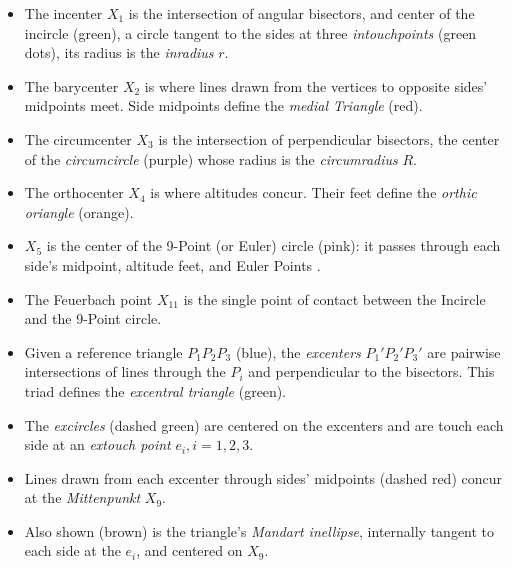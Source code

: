 \begin{itemize}
    \item The incenter $X_1$ is the intersection of angular bisectors, and center of the incircle (green), a circle tangent to the sides at three {\em intouchpoints} (green dots), its radius is the {\em inradius} $r$.
    \item The barycenter $X_2$ is where lines drawn from the vertices to opposite sides' midpoints meet. Side midpoints define the {\em medial Triangle} (red).
    \item The circumcenter $X_3$ is the intersection of perpendicular bisectors, the center of the {\em circumcircle} (purple) whose radius is the {\em circumradius} $R$.
    \item The orthocenter $X_4$ is where altitudes concur. Their feet define the {\em orthic oriangle} (orange).
    \item $X_5$ is the center of the 9-Point (or Euler) circle (pink): it passes through each side's midpoint, altitude feet, and Euler Points \cite{mw}.
    \item The Feuerbach point $X_{11}$ is the single point of contact between the Incircle and the 9-Point circle.
    \item Given a reference triangle $P_1P_2P_3$ (blue), the {\em excenters} $P_1'P_2'P_3'$ are pairwise intersections of lines through the $P_i$ and perpendicular to the bisectors. This triad defines the {\em excentral triangle} (green).\
    \item The {\em excircles} (dashed green) are centered on the excenters and are touch each side at an {\em extouch point} $e_i,i=1,2,3$.
    \item Lines drawn from each excenter through sides' midpoints (dashed red) concur at the {\em Mittenpunkt} $X_9$.
    \item Also shown (brown) is the triangle's {\em Mandart inellipse}, internally tangent to each side at the $e_i$, and centered on $X_9$.
\end{itemize}

